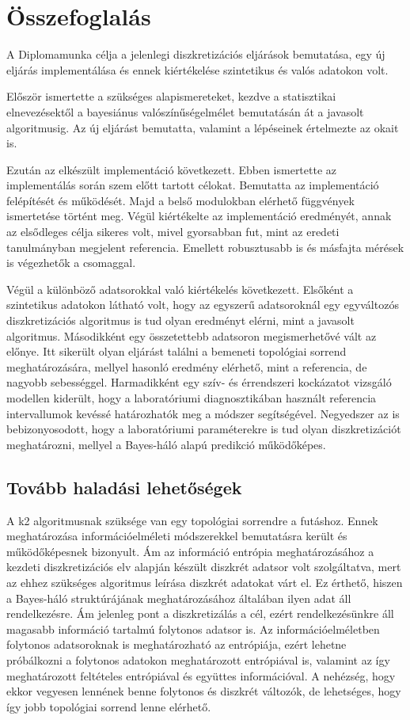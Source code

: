 \chapter{Összefoglalás}
A Diplomamunka célja a jelenlegi diszkretizációs eljárások bemutatása, egy új eljárás implementálása és ennek kiértékelése szintetikus és valós adatokon volt.

Először ismertette a szükséges alapismereteket, kezdve a statisztikai elnevezésektől a bayesiánus valószínűségelmélet bemutatásán át a javasolt algoritmusig. Az új eljárást bemutatta, valamint a lépéseinek értelmezte az okait is.

Ezután az elkészült implementáció következett. Ebben ismertette az implementálás során szem előtt tartott célokat. Bemutatta az implementáció felépítését és működését. Majd a belső modulokban elérhető függvények ismertetése történt meg. Végül kiértékelte az implementáció eredményét, annak az elsődleges célja sikeres volt, mivel gyorsabban fut, mint az eredeti tanulmányban megjelent referencia. Emellett robusztusabb is és másfajta mérések is végezhetők a csomaggal.

Végül a különböző adatsorokkal való kiértékelés következett. Elsőként a szintetikus adatokon látható volt, hogy az egyszerű adatsoroknál egy egyváltozós diszkretizációs algoritmus is tud olyan eredményt elérni, mint a javasolt algoritmus. Másodikként egy összetettebb adatsoron megismerhetővé vált az előnye. Itt sikerült olyan eljárást találni a bemeneti topológiai sorrend meghatározására, mellyel hasonló eredmény elérhető, mint a referencia, de nagyobb sebességgel. Harmadikként egy szív- és érrendszeri kockázatot vizsgáló modellen kiderült, hogy a laboratóriumi diagnosztikában használt referencia intervallumok kevéssé határozhatók meg a módszer segítségével. Negyedszer az is bebizonyosodott, hogy a laboratóriumi paraméterekre is tud olyan diszkretizációt meghatározni, mellyel a Bayes-háló alapú predikció működőképes.

\section{Tovább haladási lehetőségek}
A k2 algoritmusnak szüksége van egy topológiai sorrendre a futáshoz. Ennek meghatározása információelméleti módszerekkel bemutatásra került és működőképesnek bizonyult. Ám az információ entrópia meghatározásához a kezdeti diszkretizációs elv alapján készült diszkrét adatsor volt szolgáltatva, mert az ehhez szükséges algoritmus leírása diszkrét adatokat várt el. Ez érthető, hiszen a Bayes-háló struktúrájának meghatározásához általában ilyen adat áll rendelkezésre. Ám jelenleg pont a diszkretizálás a cél, ezért rendelkezésünkre áll magasabb információ tartalmú folytonos adatsor is. Az információelméletben folytonos adatsoroknak is meghatározható az entrópiája, ezért lehetne próbálkozni a folytonos adatokon meghatározott entrópiával is, valamint az így meghatározott feltételes entrópiával és együttes információval. A nehézség, hogy ekkor vegyesen lennének benne folytonos és diszkrét változók, de lehetséges, hogy így jobb topológiai sorrend lenne elérhető.

